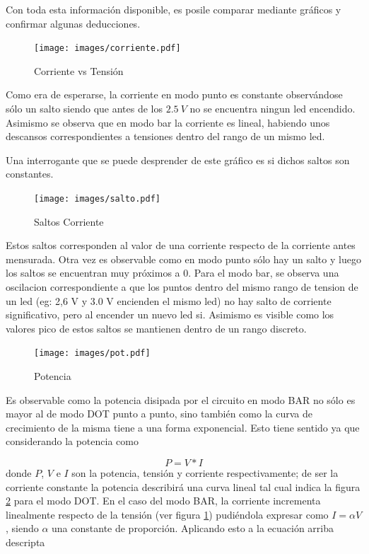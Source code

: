\documentclass[12pt,a4paper]{article}
\begin{document}
			Con toda esta información disponible, es posile comparar mediante gráficos y confirmar algunas deducciones.

			\begin{figure}[H]
			\centering
				\texttt{[image: images/corriente.pdf]}\caption{Corriente vs Tensión}\label{fig:corriente}
			\end{figure}

			Como era de esperarse, la corriente en modo punto es constante observándose sólo un salto siendo que antes de los $2.5 \:V$ no se encuentra ningun led encendido. Asimismo se observa que en modo bar la corriente es lineal, habiendo unos descansos correspondientes a tensiones dentro del rango de un mismo led. 

			Una interrogante que se puede desprender de este gráfico es si dichos saltos son constantes.

			\begin{figure}[H]
			\centering
				\texttt{[image: images/salto.pdf]}\caption{Saltos Corriente}
			\end{figure}

			Estos saltos corresponden al valor de una corriente respecto de la corriente antes mensurada. Otra vez es observable como en modo punto sólo hay un salto y luego los saltos se encuentran muy próximos a 0. Para el modo bar, se observa una oscilacion correspondiente a que los puntos dentro del mismo rango de tension de un led (eg: 2,6 V y 3.0 V encienden el mismo led) no hay salto de corriente significativo, pero al encender un nuevo led si. Asimismo es visible como los valores pico de estos saltos se mantienen dentro de un rango discreto.

			\begin{figure}[H]
			\centering
				\texttt{[image: images/pot.pdf]}\caption{Potencia}\label{fig:potencia}
			\end{figure}

			Es observable como la potencia disipada por el circuito en modo BAR no sólo es mayor al de modo DOT punto a punto, sino también como la curva de crecimiento de la misma tiene a una forma exponencial. Esto tiene sentido ya que considerando la potencia como

			\begin{equation}
				P = V * I
			\end{equation}
			donde $P$, $V$ e $I$ son la potencia, tensión y corriente respectivamente; de ser la corriente constante la potencia describirá una curva lineal tal cual indica la figura \ref{fig:potencia} para el modo DOT. En el caso del modo BAR, la corriente incrementa linealmente respecto de la tensión (ver figura \ref{fig:corriente}) pudiéndola expresar como $I = \alpha V$, siendo $\alpha$ una constante de proporción. Aplicando esto a la ecuación arriba descripta
\end{document}
